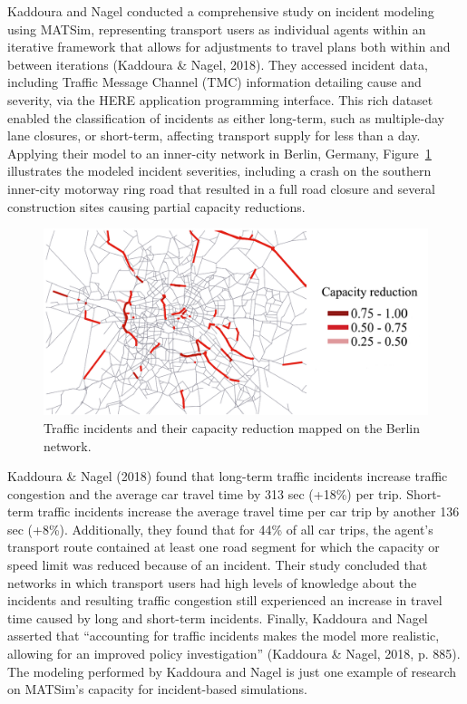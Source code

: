\documentclass[fancy, oneside, mastersfancy, ms]{byuthesis}
\begin{document}
Kaddoura and Nagel conducted a comprehensive study on incident modeling
using MATSim, representing transport users as individual agents within
an iterative framework that allows for adjustments to travel plans both
within and between iterations (Kaddoura \& Nagel, 2018). They accessed
incident data, including Traffic Message Channel (TMC) information
detailing cause and severity, via the HERE application programming
interface. This rich dataset enabled the classification of incidents as
either long-term, such as multiple-day lane closures, or short-term,
affecting transport supply for less than a day. Applying their model to
an inner-city network in Berlin, Germany, Figure~\ref{fig-berlin_cap}
illustrates the modeled incident severities, including a crash on the
southern inner-city motorway ring road that resulted in a full road
closure and several construction sites causing partial capacity
reductions.

\begin{figure}

{\centering \includegraphics{figures/berlin_capacity.png}

}

\caption{\label{fig-berlin_cap}Traffic incidents and their capacity
reduction mapped on the Berlin network.}

\end{figure}

Kaddoura \& Nagel (2018) found that long-term traffic incidents increase
traffic congestion and the average car travel time by 313 sec (+18\%)
per trip. Short-term traffic incidents increase the average travel time
per car trip by another 136 sec (+8\%). Additionally, they found that
for 44\% of all car trips, the agent's transport route contained at
least one road segment for which the capacity or speed limit was reduced
because of an incident. Their study concluded that networks in which
transport users had high levels of knowledge about the incidents and
resulting traffic congestion still experienced an increase in travel
time caused by long and short-term incidents. Finally, Kaddoura and
Nagel asserted that ``accounting for traffic incidents makes the model
more realistic, allowing for an improved policy investigation''
(Kaddoura \& Nagel, 2018, p. 885). The modeling performed by Kaddoura
and Nagel is just one example of research on MATSim's capacity for
incident-based simulations.
\end{document}

